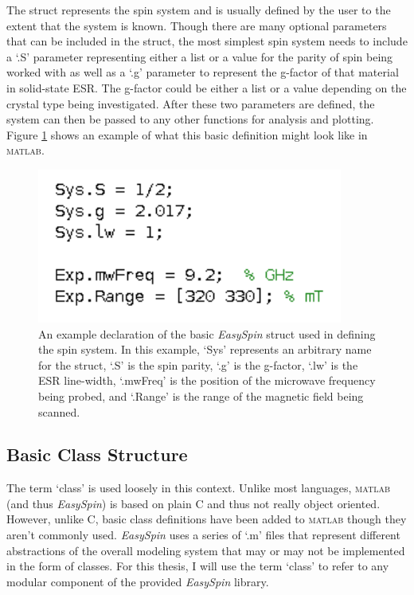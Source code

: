 \documentclass[oneside, astronomy, noacknowlegments]{BYUPhys}
\begin{document}
The struct represents the spin system and is usually defined by the user to the extent that the system is known. Though there are many optional parameters that can be included in the struct, the most simplest spin system needs to include a `.S' parameter representing either a list or a value for the parity of spin being worked with as well as a `.g' parameter to represent the g-factor of that material in solid-state ESR. The g-factor could be either a list or a value depending on the crystal type being investigated. After these two parameters are defined, the system can then be passed to any other functions for analysis and plotting. Figure \ref{fig:SpinDefinition} shows an example of what this basic definition might look like in \textsc{matlab}.

\begin{figure}
    \centerline{\includegraphics{example_params_fig}}
    \caption[Simple Spin System Definition]{\label{fig:SpinDefinition}
     An example declaration of the basic \textit{EasySpin} struct used in defining the spin system. In this example, `Sys' represents an arbitrary name for the struct, `.S' is the spin parity, `.g' is the g-factor, `.lw' is the ESR line-width, `.mwFreq' is the position of the microwave frequency being probed, and `.Range' is the range of the magnetic field being scanned.}
 \end{figure}

\subsection{Basic Class Structure}

The term `class' is used loosely in this context. Unlike most languages, \textsc{matlab} (and thus \textit{EasySpin}) is based on plain C and thus not really object oriented. However, unlike C, basic class definitions have been added to \textsc{matlab} though they aren't commonly used. \textit{EasySpin} uses a series of `.m' files that represent different abstractions of the overall modeling system that may or may not be implemented in the form of classes. For this thesis, I will use the term `class' to refer to any modular component of the provided \textit{EasySpin} library.
\end{document}
